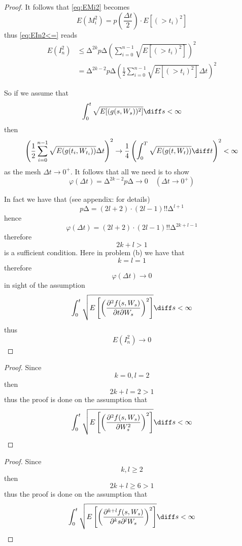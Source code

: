 \begin{subproblem}[(\alph*)]
\begin{proof}
        It follows that \cref{eq:EMi2} becomes
        \[E(M_i^2)=p\left(\frac{\Delta t}{2}\right)
        \cdot E[(\gt{t_i})^2]\]
        thus \cref{eq:EIn2<=} reads
        \[\begin{aligned}
            E(I_n^2)&\leq
            \increment^{2k}p\increment\left(\sum_{i=0}^{n-1}
            \sqrt{E[(\gt{t_i})^2]}\right)^2\\
            &=\increment^{2k-2}p\increment
            \left(\frac12\sum_{i=0}^{n-1}\sqrt{E[(\gt{t_i})^2]}\Delta t\right)^2
        \end{aligned}\]

        So if we assume that
        \[\int_0^t\sqrt{E[(\gt{s})^2]}\diff s<\infty\]
        then
        \[
            \left(\frac12\sum_{i=0}^{n-1}\sqrt{E(\gt{t_i})}\Delta t\right)^2
            \to
            \frac14\left(\int_0^T\sqrt{E(\gt{t})}\diff t\right)^2
            <\infty
        \]
        as the mesh $\Delta t\to 0^+$.
        It follows that all we need is to show
        \[\varphi(\Delta t)=\increment^{2k-2}p\increment\to 0\quad(\Delta t\to 0^+)\]

        In fact we have that (see appendix:  for details)
        \[p\increment=(2l+2)\cdot(2l-1)!!\increment^{l+1}\]
        hence
        \[\varphi(\Delta t)
        =(2l+2)\cdot(2l-1)!!\increment^{2k+l-1}\]
        therefore
        \[2k+l>1\]
        is a sufficient condition.
        Here in problem (b) we have that
        \[k=l=1\]
        therefore
        \[\varphi(\Delta t)\to 0\]
        in sight of the assumption
        \[
            \int_0^t
            \sqrt{E\left[\left(\frac{\partial^2f(s,W_{s})}{\partial t\partial W_s}\right)^2\right]}
            \diff s
            <\infty
        \]
        thus
        \[E(I_n^2)\to 0\]
        \end{proof}

        \item
        \begin{proof}
        Since
        \[k=0,l=2\]
        then
        \[2k+l=2>1\]
        thus the proof is done on the assumption that
        \[
            \int_0^t
            \sqrt{E\left[\left(\frac{\partial^2f(s,W_{s})}{\partial W_s^2}\right)^2\right]}
            \diff s
            <\infty
        \]
        \end{proof}

        \item
        \begin{proof}
        Since
        \[k,l\geq 2\]
        then
        \[2k+l\geq 6>1\]
        thus the proof is done on the assumption that
        \[
            \int_0^t
            \sqrt{E\left[\left(\frac{\partial^{k+l}f(s,W_{s})}{\partial^k s\partial^l W_s}\right)^2\right]}
            \diff s
            <\infty
        \]
        \end{proof}


    \end{subproblem}

